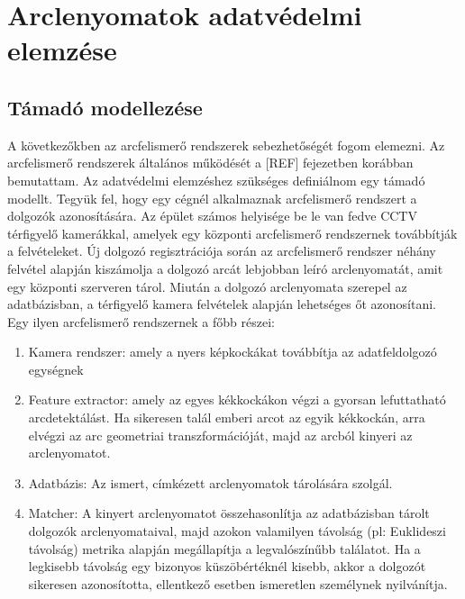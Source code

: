 \section{Arclenyomatok adatvédelmi elemzése}
\label{sec:4}

\subsection{Támadó modellezése}  %

A következőkben az arcfelismerő rendszerek sebezhetőségét fogom elemezni. Az arcfelismerő rendszerek általános működését a [REF] fejezetben korábban bemutattam. Az adatvédelmi elemzéshez szükséges definiálnom egy támadó modellt. Tegyük fel, hogy egy cégnél alkalmaznak arcfelismerő rendszert a dolgozók azonosítására. Az épület számos helyisége be le van fedve CCTV térfigyelő kamerákkal, amelyek egy központi arcfelismerő rendszernek továbbítják a felvételeket. Új dolgozó regisztrációja során az arcfelismerő rendszer néhány felvétel alapján kiszámolja a dolgozó arcát lebjobban leíró arclenyomatát, amit egy központi szerveren tárol. Miután a dolgozó arclenyomata szerepel az adatbázisban, a térfigyelő kamera felvételek alapján lehetséges őt azonosítani. Egy ilyen arcfelismerő rendszernek a főbb részei: 

\begin{enumerate}
	\item Kamera rendszer: amely a nyers képkockákat továbbítja az adatfeldolgozó egységnek
	\item Feature extractor: amely az egyes kékkockákon végzi a gyorsan lefuttatható arcdetektálást. Ha sikeresen talál emberi arcot az egyik kékkockán, arra elvégzi az arc geometriai transzformációját, majd az arcból kinyeri az arclenyomatot.
	\item Adatbázis: Az ismert, címkézett arclenyomatok tárolására szolgál.
	\item Matcher: A kinyert arclenyomatot összehasonlítja az adatbázisban tárolt dolgozók arclenyomataival, majd azokon valamilyen távolság (pl: Euklideszi távolság) metrika alapján megállapítja a legvalószínűbb találatot. Ha a legkisebb távolság egy bizonyos küszöbértéknél kisebb, akkor a dolgozót sikeresen azonosította, ellentkező esetben ismeretlen személynek nyilvánítja.
\end{enumerate}

